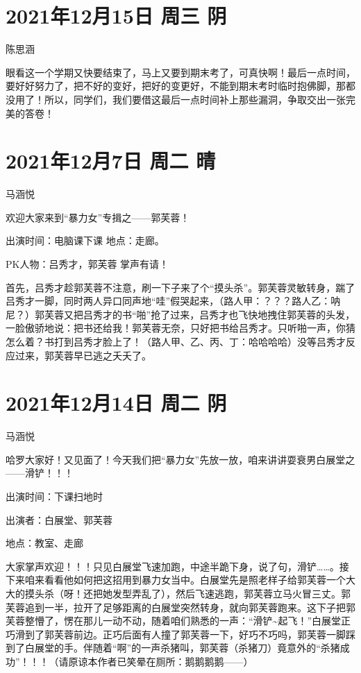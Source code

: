 \section{2021年12月15日 周三 阴}

陈思涵

眼看这一个学期又快要结束了，马上又要到期末考了，可真快啊！最后一点时间，要好好努力了，把不好的变好，把好的变更好，不能到期末考时临时抱佛脚，那都没用了！所以，同学们，我们要借这最后一点时间补上那些漏洞，争取交出一张完美的答卷！

\section{2021年12月7日 周二 晴}

马涵悦

欢迎大家来到“暴力女”专揖之——郭芙蓉！

出演时间：电脑课下课 地点：走廊。

PK人物：吕秀才，郭芙蓉 掌声有请！

首先，吕秀才趁郭芙蓉不注意，刷一下子来了个“摸头杀”。郭芙蓉灵敏转身，踹了吕秀才一脚，同时两人异口同声地“哇”假哭起来，（路人甲：？？？路人乙：呐尼？）郭芙蓉又把吕秀才的书“啪”抢了过来，吕秀才也飞快地拽住郭芙蓉的头发，一脸傲骄地说：把书还给我！郭芙蓉无奈，只好把书给吕秀才。只听啪一声，你猜怎么着？书打到吕秀才脸上了！（路人甲、乙、丙、丁：哈哈哈哈）没等吕秀才反应过来，郭芙蓉早已逃之夭夭了。

\section{2021年12月14日 周二 阴}

马涵悦

哈罗大家好！又见面了！今天我们把“暴力女”先放一放，咱来讲讲耍衰男白展堂之——滑铲！！！

出演时间：下课扫地时

出演者：白展堂、郭芙蓉

地点：教室、走廊

大家掌声欢迎！！！只见白展堂飞速加跑，中途半跪下身，说了句，滑铲……。接下来咱来看看他如何把这招用到暴力女当中。白展堂先是照老样子给郭芙蓉一个大大的摸头杀（呀！还把她发型弄乱了），然后飞速逃跑，郭芙蓉立马火冒三丈。郭芙蓉追到一半，拉开了足够距离的白展堂突然转身，就向郭芙蓉跑来。这下子把郭芙蓉整懵了，愣在那儿一动不动，随着咱们熟悉的一声：“滑铲\textasciitilde 起飞！”白展堂正巧滑到了郭芙蓉前边。正巧后面有人撞了郭芙蓉一下，好巧不巧吗，郭芙蓉一脚踩到了白展堂的手。伴随着“啊”的一声杀猪叫，郭芙蓉（杀猪刀）竟意外的“杀猪成功”！！！（请原谅本作者已笑晕在厕所：鹅鹅鹅鹅——）

